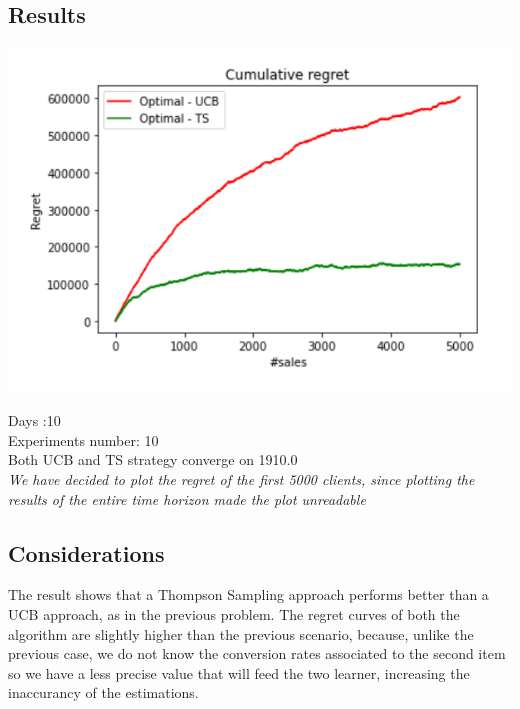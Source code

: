 \subsection*{Results}
\begin{center}
	\includegraphics[scale=1.2]{Images/n4}
\end{center}
Days :10\\
Experiments number: 10 \\
Both UCB and TS strategy converge on 1910.0\\
\textit{We have decided to plot the regret of the first 5000 clients, since plotting the results of the entire time horizon made the plot unreadable}

\subsection*{Considerations}
The result shows that a Thompson Sampling approach performs better than a UCB approach, as in the previous problem. The regret curves of both the algorithm are slightly higher than the previous scenario, because, unlike the previous case, we do not know the conversion rates associated to the second item so we have a less precise value that will feed the two learner, increasing the inaccurancy of the estimations.  

